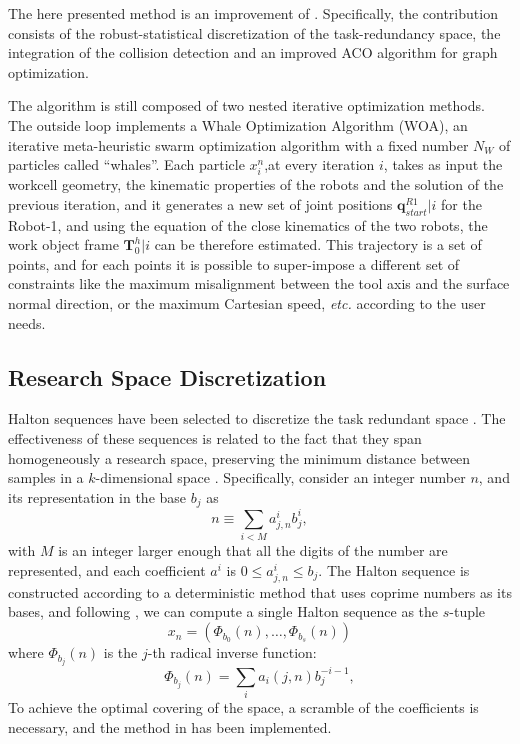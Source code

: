 \documentclass[twocolumn]{svjour3}
\newcommand{\vv}[1]{``#1''}
\newcommand{\R}[1]{R#1}
\newcommand{\RA}{\R{1}}
\newcommand{\qrA}{\mathbf{q}^{\RA}}
\newcommand{\Tr}[2]{\mathbf{T}^{#2}_{#1}}
\begin{document}
The here presented method is an improvement of \cite{Nicola2018}. Specifically, the contribution consists of the robust-stat\-istical discretization of the task-redundancy space, the integration of the collision detection and an improved ACO algorithm for graph optimization.

The algorithm is still composed of two nested iterative optimization methods.
The outside loop implements a Wha\-le Optimization Algorithm (WOA), an iterative meta-heu\-ris\-tic swarm optimization algorithm with a fixed number $N_{W}$ of particles called \vv{whales}. Each particle $x^n_i$,at every iteration $i$, takes as input the workcell geometry, the kinematic properties of the robots and the solution of the previous iteration, and it generates a new set of joint positions $\qrA_{start}|i $ for the Robot-1, and using the equation of the close kinematics of the two robots, the work object frame $\Tr{0}{h}|i$ can be therefore estimated.
%
This trajectory is a set of points, and for each points it is possible to super-impose a different set of constraints like the maximum misalignment between the tool axis and the surface normal direction, or the maximum Cartesian speed, \textit{etc.} according to the user needs.

\subsection{Research Space Discretization}

Halton sequences have been selected to discretize the task redundant space \cite{CHI20059}. The effectiveness of these sequences is related to the fact that they span homogeneously a research space, preserving the minimum distance between samples in a $k$-dimensional space \cite{Tijdeman75}. 
Specifically, consider an integer number $n$, and its representation in the base $b_j$ as
$$
n \equiv \sum_{i<M}a^{i}_{j,n} b_j^{i},
$$
with $M$ is an integer larger enough that all the digits of the number are represented, and each coefficient $a^i$ is $0 \leq a^{i}_{j,n} \leq b_j$.
The Halton sequence is constructed according to a deterministic method that uses coprime numbers as its bases, and following \cite{Kocis97}, we can compute a single Halton sequence as the $s$-tuple
$$
x_n = \left( \Phi_{b_0} (n),\ldots,\Phi_{b_s}( n) \right)
$$
where $\Phi_{b_j}(n)$ is the $j$-th radical inverse function:
$$
\Phi_{b_j}(n) = \sum_{i}a_{i}(j,n) b_j^{-i-1},
$$
To achieve the optimal covering of the space, a scramble of the coefficients is necessary, and the method in \cite{MATOUSEK1998527} has been implemented. 
\end{document}
